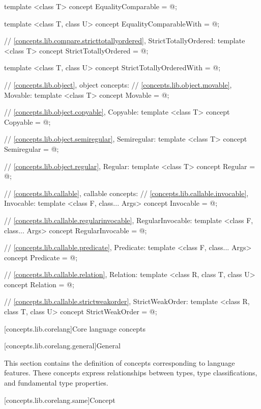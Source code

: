 \begin{addedblock}
\begin{codeblock}
{  template <class T>
  concept EqualityComparable = @\seebelow@;

  template <class T, class U>
  concept EqualityComparableWith = @\seebelow@;

  // \ref{concepts.lib.compare.stricttotallyordered}, StrictTotallyOrdered:
  template <class T>
  concept StrictTotallyOrdered = @\seebelow@;

  template <class T, class U>
  concept StrictTotallyOrderedWith = @\seebelow@;

  // \ref{concepts.lib.object}, object concepts:
  // \ref{concepts.lib.object.movable}, Movable:
  template <class T>
  concept Movable = @\seebelow@;

  // \ref{concepts.lib.object.copyable}, Copyable:
  template <class T>
  concept Copyable = @\seebelow@;

  // \ref{concepts.lib.object.semiregular}, Semiregular:
  template <class T>
  concept Semiregular = @\seebelow@;

  // \ref{concepts.lib.object.regular}, Regular:
  template <class T>
  concept Regular = @\seebelow@;

  // \ref{concepts.lib.callable}, callable concepts:
  // \ref{concepts.lib.callable.invocable}, Invocable:
  template <class F, class... Args>
  concept Invocable = @\seebelow@;

  // \ref{concepts.lib.callable.regularinvocable}, RegularInvocable:
  template <class F, class... Args>
  concept RegularInvocable = @\seebelow@;

  // \ref{concepts.lib.callable.predicate}, Predicate:
  template <class F, class... Args>
  concept Predicate = @\seebelow@;

  // \ref{concepts.lib.callable.relation}, Relation:
  template <class R, class T, class U>
  concept Relation = @\seebelow@;

  // \ref{concepts.lib.callable.strictweakorder}, StrictWeakOrder:
  template <class R, class T, class U>
  concept StrictWeakOrder = @\seebelow@;
}
\end{codeblock}

[concepts.lib.corelang]{Core language concepts}

[concepts.lib.corelang.general]{General}

\pnum
This section contains the definition of concepts corresponding to language features.
These concepts express relationships between types, type classifications, and
fundamental type properties.

[concepts.lib.corelang.same]{Concept }


\end{addedblock}
